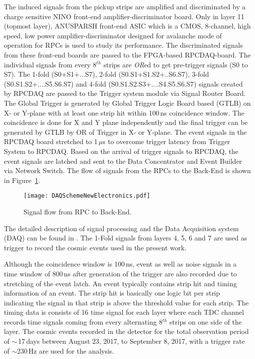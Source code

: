 The induced signals from the pickup strips are amplified and
discriminated by a charge sensitive NINO\cite{nino} front-end
amplifier-discriminator board. Only in layer 11 (topmost layer),
ANUSPARSH front-end ASIC\cite{anusp} which is a CMOS, 8-channel,
high speed, low power amplifier-discriminator designed for
avalanche mode of operation for RPCs is used to study its performance.
The discriminated signals from these front-end boards are passed
to the FPGA-based RPCDAQ-board. The individual signals from every 
8$^{th}$ strips are \emph{OR}ed to get pre-trigger signals (S0 to S7).
The 1-fold (S0+S1+...S7), 2-fold (S0.S1+S1.S2+..S6.S7),
3-fold (S0.S1.S2+....S5.S6.S7) and 4-fold
(S0.S1.S2.S3+....S4.S5.S6.S7) signals created by RPCDAQ are passed
to the Trigger system module via Signal Router Board. The Global
Trigger is generated by Global Trigger Logic Board based (GTLB)
on X- or Y-plane with at least one strip hit within
100\,ns coincidence window. The coincidence is done for X and Y plane
independently and the final trigger can be generated by GTLB by OR
of Trigger in X- or Y-plane. The event signals in the RPCDAQ board
stretched to 1\,$\mu$s to overcome trigger latency from Trigger System
to RPCDAQ. Based on the arrival of trigger signals to RPCDAQ,
the event signals are latched and sent to the Data Concentrator
and Event Builder via Network Switch. The flow of signals from the
RPCs to the Back-End is shown in Figure~\ref{fig:sigflow}.
\begin{figure}[h]
  \texttt{[image: DAQSchemeNewElectronics.pdf]} 
  \caption{Signal flow from RPC to Back-End.}
  \label{fig:sigflow}
\end{figure}
The detailed description of signal processing and the Data Acquisition
system (DAQ) can be found in \cite{elec1}. The 1-Fold signals
from layers 4, 5, 6 and 7 are used as trigger to record the cosmic
events used in the present work.

Although the coincidence window is 100\,ns, event as well as noise
signals in a time window of 800\,ns after generation of the trigger
are also recorded due to stretching of the event latch. An event
typically contains strip hit and timing information of an event.
The strip hit is basically one logic bit per strip indicating
the signal in that strip is above the threshold value for each strip.
The timing data is consists of 16 time signal for each layer where
each TDC channel records time signals coming from every alternating
8$^{th}$ strips on one side of the layer.
The cosmic events recorded in the detector for the total observation
period of $\sim$\,17\,days between August 23, 2017, to September 8,
2017, with a trigger rate of $\sim$230\,Hz are used for the analysis.


